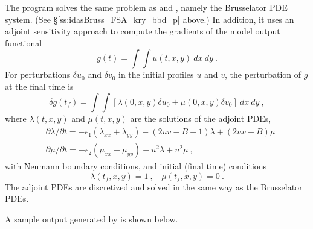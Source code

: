 The  program solves the same problem as
 and , namely the
Brusselator PDE system.  (See \S\ref{ss:idasBruss_FSA_kry_bbd_p} above.)
In addition, it uses an adjoint sensitivity approach to compute the
gradients of the model output functional
\begin{equation*}
  g(t) = \int \int u(t,x,y)~dx~dy ~.
\end{equation*}
For perturbations $\delta u_0$ and $\delta v_0$ in the initial profiles
$u$ and $v$, the perturbation of $g$ at the final time is
\begin{equation*}
  \delta g(t_f) = \int \int [\lambda(0,x,y) \delta u_0 + \mu(0,x,y) \delta v_0] ~dx~dy ~,
\end{equation*}
where $\lambda(t,x,y)$ and $\mu(t,x,y)$ are the solutions of the adjoint PDEs,
\begin{equation*}
\begin{split}
  &\partial \lambda / \partial t = -\epsilon_1 (\lambda_{xx} + \lambda_{yy})
                              - (2 u v - B - 1) \lambda + (2 u v - B) \mu \\
  &\partial \mu / \partial t = -\epsilon_2 (\mu_{xx} + \mu_{yy})
                              - u^2 \lambda + u^2 \mu ~,
\end{split}
\end{equation*}
with Neumann boundary conditions, and initial (final time) conditions
\begin{equation*}
  \lambda (t_f,x,y) = 1 ~, ~~~~ \mu (t_f,x,y) =  0 ~.
\end{equation*}
The adjoint PDEs are discretized and solved in the same way as the
Brusselator PDEs.

A sample output generated by  is shown below.


